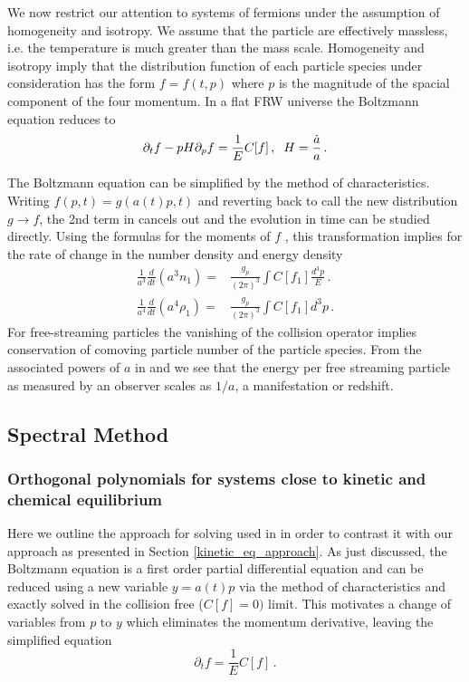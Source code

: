 We now restrict our attention to  systems of fermions under the assumption of homogeneity and isotropy. We assume that the particle are effectively massless,  i.e. the temperature is much greater than the mass scale.  Homogeneity and isotropy imply that the distribution function of each particle species under consideration has the form $f=f(t,p)$ where $p$ is the magnitude of the spacial component of the four momentum.  In a flat FRW universe the Boltzmann equation reduces to
\begin{equation}\label{boltzmann_p}
\partial_t f-pH \partial_p f=\frac{1}{E}C[f]\,,\hspace{2mm} H=\frac{\dot{a}}{a}\,.
\end{equation}

The Boltzmann equation  can be simplified by the method of characteristics. Writing $f(p, t)=g(a(t)p,t)$ and reverting back to call the new distribution $g\to f$, the 2nd term in  cancels out and the evolution in time can be studied directly.  Using the formulas for the moments of $f$ , this transformation implies for the rate of change in the   number density and energy density  
\begin{align}\label{n_div}
\frac{1}{a^3}\frac{d}{dt}(a^3n_1)=&\frac{g_p}{(2\pi)^3}\int C[f_1] \frac{d^3p}{E}\,.\\
\label{rho_div}
\frac{1}{a^4}\frac{d}{dt}(a^4\rho_1)=&\frac{g_p}{(2\pi)^3}\int C[f_1] d^3p \,.
\end{align} 
For free-streaming particles the vanishing of the collision operator implies conservation of comoving particle number of the particle species. From the associated powers of $a$ in  and  we see that the energy per free streaming particle as measured by an observer scales as $1/a$, a manifestation or redshift.

\subsection{Spectral Method}\label{the_method}
\subsubsection{Orthogonal polynomials for systems close to kinetic and chemical equilibrium}\label{free_stream_approach}
Here we outline the approach for solving  used in \cite{Esposito2000,Mangano2002} in order to contrast it with our approach as presented in Section \ref{kinetic_eq_approach}.  As just discussed, the Boltzmann equation  is a first order partial differential equation and can be reduced using a new variable $y=a(t)p$  via the method of characteristics and exactly solved in the collision free ($C[f]=0)$ limit.   This motivates a change of variables from $p$ to $y$ which eliminates the momentum derivative, leaving the simplified equation
\begin{equation}\label{a_vars}
\partial_tf=\frac{1}{E} C[f]\,.
\end{equation}

